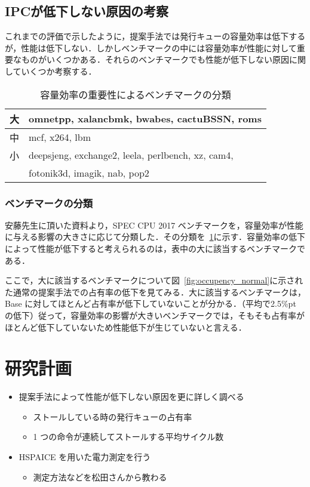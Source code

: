 \documentclass[twocolumn]{jsarticle}
\begin{document}
  \clearpage
  \subsection{IPCが低下しない原因の考察}
  これまでの評価で示したように，提案手法では発行キューの容量効率は低下するが，性能は低下しない．しかしベンチマークの中には容量効率が性能に対して重要なものがいくつかある．それらのベンチマークでも性能が低下しない原因に関していくつか考察する．
  
  \begin{table}[htb]
    \caption{容量効率の重要性によるベンチマークの分類}
    \footnotesize
    \center
      \begin{tabular}{l|l} \hline 
       大 & omnetpp, xalancbmk, bwabes, cactuBSSN, roms \\ \hline
       中 & mcf, x264, lbm \\ \hline
       小 & deepsjeng, exchange2, leela, perlbench, xz, cam4, \\ 
          & fotonik3d, imagik, nab, pop2 \\ \hline
    \end{tabular}
    \label{tab:bench_capacity}
  \end{table}

  \subsubsection{ベンチマークの分類}
  安藤先生に頂いた資料より，SPEC CPU 2017 ベンチマークを，容量効率が性能に与える影響の大きさに応じて分類した．その分類を~\ref{tab:bench_capacity}に示す．容量効率の低下によって性能が低下すると考えられるのは，表中の大に該当するベンチマークである．

  ここで，大に該当するベンチマークについて図~\ref{fig:occupency_normal}に示された通常の提案手法での占有率の低下を見てみる．大に該当するベンチマークは，Base
  に対してほとんど占有率が低下していないことが分かる．（平均で2.5\%pt の低下）従って，容量効率の影響が大きいベンチマークでは，そもそも占有率がほとんど低下していないため性能低下が生じていないと言える．  

  \section{研究計画}
  
  \begin{itemize}
    \item 提案手法によって性能が低下しない原因を更に詳しく調べる
    \begin{itemize}
      \item ストールしている時の発行キューの占有率
      \item 1 つの命令が連続してストールする平均サイクル数
    \end{itemize}
    \item HSPAICE を用いた電力測定を行う
    \begin{itemize}
      \item 測定方法などを松田さんから教わる
    \end{itemize}
  \end{itemize}
  
  
  
   
  
  
  
\end{document}
